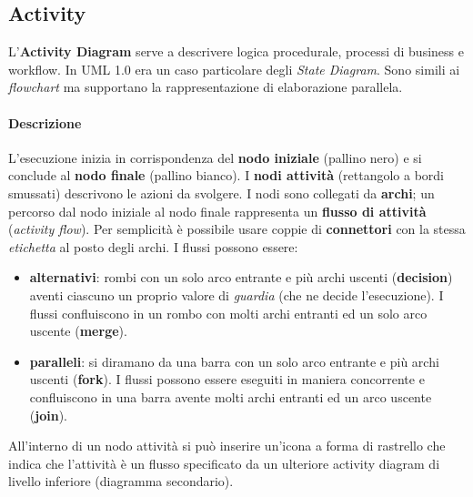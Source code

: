\subsection{Activity}

L'\textbf{Activity Diagram} serve a descrivere logica procedurale, processi di business e workflow. In UML 1.0 era un caso particolare degli \textit{State Diagram}. Sono simili ai \textit{flowchart} ma supportano la rappresentazione di elaborazione parallela.

\paragraph{Descrizione} L'esecuzione inizia in corrispondenza del \textbf{nodo iniziale} (pallino nero) e si conclude al \textbf{nodo finale} (pallino bianco). I \textbf{nodi attività} (rettangolo a bordi smussati) descrivono le azioni da svolgere. I nodi sono collegati da \textbf{archi}; un percorso dal nodo iniziale al nodo finale rappresenta un \textbf{flusso di attività} (\textit{activity flow}). Per semplicità è possibile usare coppie di \textbf{connettori} con la stessa \textit{etichetta} al posto degli archi. I flussi possono essere:
\begin{itemize}
    \item \textbf{alternativi}: rombi con un solo arco entrante e più archi uscenti (\textbf{decision}) aventi ciascuno un proprio valore di \textit{guardia} (che ne decide l'esecuzione). I flussi confluiscono in un rombo con molti archi entranti ed un solo arco uscente (\textbf{merge}).
    \item \textbf{paralleli}: si diramano da una barra con un solo arco entrante e più archi uscenti (\textbf{fork}). I flussi possono essere eseguiti in maniera concorrente e confluiscono in una barra avente molti archi entranti ed un arco uscente (\textbf{join}).
\end{itemize}
All'interno di un nodo attività si può inserire un'icona a forma di rastrello che indica che l'attività è un flusso specificato da un ulteriore activity diagram di livello inferiore (diagramma secondario).

